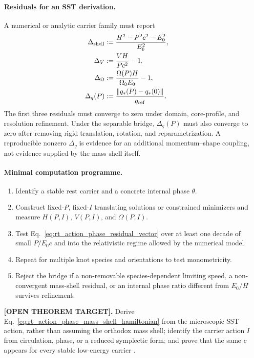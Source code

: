 \paragraph{Residuals for an SST derivation.}
A numerical or analytic carrier family must report
\begin{align}
    \Delta_{\rm shell}
    &:=\frac{H^2-P^2c^2-E_0^2}{E_0^2},
    \\
    \Delta_V
    &:=\frac{VH}{Pc^2}-1,
    \\
    \Delta_\Omega
    &:=\frac{\Omega(P)H}{\Omega_0E_0}-1,
    \\
    \Delta_q(P)
    &:=\frac{\lVert q_*(P)-q_*(0)\rVert}{q_{\rm ref}}.
    \label{eq:rt_action_phase_residual_vector}
\end{align}
The first three residuals must converge to zero under domain, core-profile, and
resolution refinement.  Under the separable bridge, \(\Delta_q(P)\) must also
converge to zero after removing rigid translation, rotation, and
reparametrization.  A reproducible nonzero \(\Delta_q\) is evidence for an
additional momentum--shape coupling, not evidence supplied by the mass shell
itself.

\paragraph{Minimal computation programme.}
\begin{enumerate}
    \item Identify a stable rest carrier and a concrete internal phase \(\theta\).
    \item Construct fixed-\(P\), fixed-\(I\) translating solutions or constrained
    minimizers and measure \(H(P,I)\), \(V(P,I)\), and \(\Omega(P,I)\).
    \item Test Eq.~\eqref{eq:rt_action_phase_residual_vector} over at least one
    decade of small \(P/E_0c\) and into the relativistic regime allowed by the
    numerical model.
    \item Repeat for multiple knot species and orientations to test monometricity.
    \item Reject the bridge if a non-removable species-dependent limiting speed,
    a non-convergent mass-shell residual, or an internal phase ratio different
    from \(E_0/H\) survives refinement.
\end{enumerate}

\textbf{[OPEN THEOREM TARGET].}
Derive Eq.~\eqref{eq:rt_action_phase_mass_shell_hamiltonian} from the microscopic
SST action, rather than assuming the orthodox mass shell; identify the carrier
action \(I\) from circulation, phase, or a reduced symplectic form; and prove
that the same \(c\) appears for every stable low-energy carrier
\cite{Einstein1905,Arnold1989ClassicalMechanics}.

